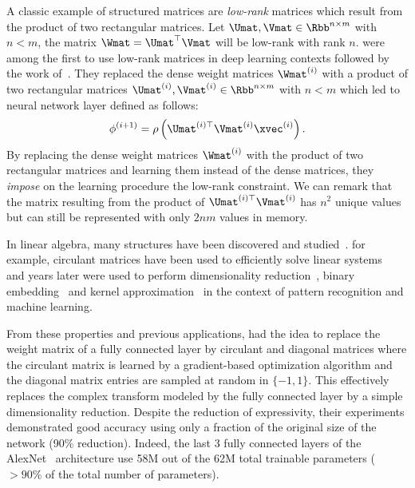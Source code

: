 
A classic example of structured matrices are \emph{low-rank} matrices which result from the product of two rectangular matrices.
Let $\Umat, \Vmat \in \Rbb^{n \times m}$ with $n < m$, the matrix $\Wmat = \Umat^\top \Vmat$ will be low-rank with rank $n$.
\citet{denil2013predicting} were among the first to use low-rank matrices in deep learning contexts followed by the work of~\citet{jaderberg2014speeding,yu2017compressing}.
They replaced the dense weight matrices $\Wmat^{(i)}$ with a product of two rectangular matrices $\Umat^{(i)}, \Vmat^{(i)} \in \Rbb^{n \times m}$ with $n < m$ which led to neural network layer defined as follows:
\begin{equation}
  \phi^{(i+1)} = \rho\left( \Umat^{(i)\top} \Vmat^{(i)} \xvec^{(i)} \right) .
\end{equation}
By replacing the dense weight matrices $\Wmat^{(i)}$ with the product of two rectangular matrices and learning them instead of the dense matrices, they \emph{impose} on the learning procedure the low-rank constraint.
We can remark that the matrix resulting from the product of $\Umat^{(i)\top} \Vmat^{(i)}$ has $n^2$ unique values but can still be represented with only $2nm$ values in memory.

In linear algebra, many structures have been discovered and studied~\cite{pan2001structured}. 
for example, circulant matrices have been used to efficiently solve linear systems~\cite{golub1996matrix} and years later were used to perform dimensionality reduction~\cite{hinrichs2011johnson,vybiral2011variant}, binary embedding~\cite{yu2014circulant} and kernel approximation~\cite{yu2015compact} in the context of pattern recognition and machine learning.


From these properties and previous applications, \citet{cheng2015exploration} had the idea to replace the weight matrix of a fully connected layer by circulant and diagonal matrices where the circulant matrix is learned by a gradient-based optimization algorithm and the diagonal matrix entries are sampled at random in $\{-1, 1\}$.
This effectively replaces the complex transform modeled by the fully connected layer by a simple dimensionality reduction.
Despite the reduction of expressivity, their experiments demonstrated good accuracy using only a fraction of the original size of the network (90\% reduction).
Indeed, the last 3 fully connected layers of the AlexNet~\cite{krizhevsky2012imagenet} architecture use 58M out of the 62M total trainable parameters ($> 90\%$ of the total number of parameters).


